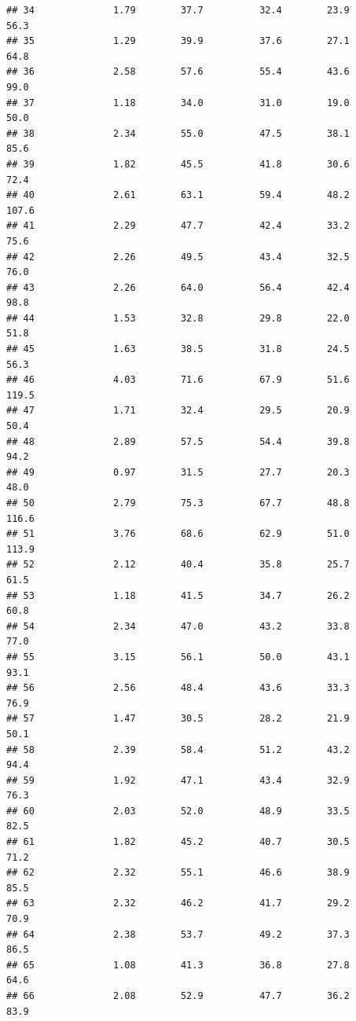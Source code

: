 \documentclass[
]{book}
\theoremstyle{definition}
\theoremstyle{definition}
\theoremstyle{definition}
\theoremstyle{definition}
\theoremstyle{remark}
\begin{document}
\begin{verbatim}
## 34              1.79        37.7          32.4        23.9             56.3
## 35              1.29        39.9          37.6        27.1             64.8
## 36              2.58        57.6          55.4        43.6             99.0
## 37              1.18        34.0          31.0        19.0             50.0
## 38              2.34        55.0          47.5        38.1             85.6
## 39              1.82        45.5          41.8        30.6             72.4
## 40              2.61        63.1          59.4        48.2            107.6
## 41              2.29        47.7          42.4        33.2             75.6
## 42              2.26        49.5          43.4        32.5             76.0
## 43              2.26        64.0          56.4        42.4             98.8
## 44              1.53        32.8          29.8        22.0             51.8
## 45              1.63        38.5          31.8        24.5             56.3
## 46              4.03        71.6          67.9        51.6            119.5
## 47              1.71        32.4          29.5        20.9             50.4
## 48              2.89        57.5          54.4        39.8             94.2
## 49              0.97        31.5          27.7        20.3             48.0
## 50              2.79        75.3          67.7        48.8            116.6
## 51              3.76        68.6          62.9        51.0            113.9
## 52              2.12        40.4          35.8        25.7             61.5
## 53              1.18        41.5          34.7        26.2             60.8
## 54              2.34        47.0          43.2        33.8             77.0
## 55              3.15        56.1          50.0        43.1             93.1
## 56              2.56        48.4          43.6        33.3             76.9
## 57              1.47        30.5          28.2        21.9             50.1
## 58              2.39        58.4          51.2        43.2             94.4
## 59              1.92        47.1          43.4        32.9             76.3
## 60              2.03        52.0          48.9        33.5             82.5
## 61              1.82        45.2          40.7        30.5             71.2
## 62              2.32        55.1          46.6        38.9             85.5
## 63              2.32        46.2          41.7        29.2             70.9
## 64              2.38        53.7          49.2        37.3             86.5
## 65              1.08        41.3          36.8        27.8             64.6
## 66              2.08        52.9          47.7        36.2             83.9

\end{verbatim}
\end{document}

